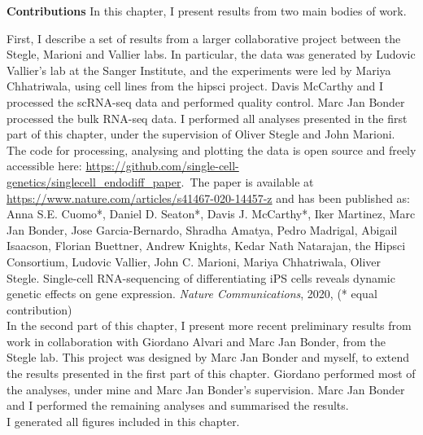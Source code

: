 \begin{Comment2}
\hspace{-3mm}\textbf{Contributions} 
In this chapter, I present results from two main bodies of work.

First, I describe a set of results from a larger collaborative project between the Stegle, Marioni and Vallier labs. 
In particular, the data was generated by Ludovic Vallier’s lab at the Sanger Institute, and the experiments were led by Mariya Chhatriwala, using cell lines from the \gls{hipsci} project.
Davis McCarthy and I processed the scRNA-seq data and performed quality control.
Marc Jan Bonder processed the bulk RNA-seq data.
I performed all analyses presented in the first part of this chapter, under the supervision of Oliver Stegle and John Marioni.
The code for processing, analysing and plotting the data is open source and freely accessible here: \url{https://github.com/single-cell-genetics/singlecell\_endodiff\_paper}.\
The paper 
is available at \url{https://www.nature.com/articles/s41467-020-14457-z} and has been published as:\\

Anna S.E. Cuomo*, Daniel D. Seaton*, Davis J. McCarthy*, Iker Martinez, Marc Jan Bonder, Jose Garcia-Bernardo, Shradha Amatya, Pedro Madrigal, Abigail Isaacson, Florian Buettner, Andrew Knights, Kedar Nath Natarajan, the Hipsci Consortium, Ludovic Vallier, John C. Marioni, Mariya Chhatriwala, Oliver Stegle. Single-cell RNA-sequencing of differentiating iPS cells reveals dynamic genetic effects on gene expression. \textit{Nature Communications}, 2020, (* equal contribution)\\


In the second part of this chapter, I present more recent preliminary results from work in collaboration with Giordano Alvari and Marc Jan Bonder, from the Stegle lab.
This project was designed by Marc Jan Bonder and myself, to extend the results presented in the first part of this chapter.
Giordano performed most of the analyses, under mine and Marc Jan Bonder's supervision.
Marc Jan Bonder and I performed the remaining analyses and summarised the results.\\

I generated all figures included in this chapter.
\end{Comment2}

